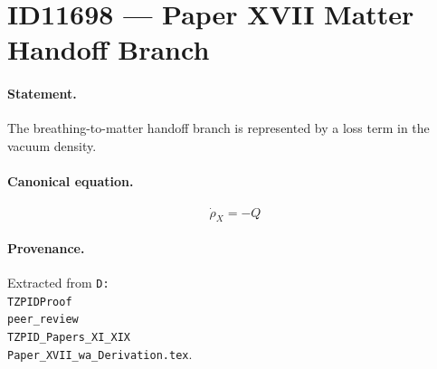 \section*{ID11698 --- Paper XVII Matter Handoff Branch}

\paragraph{Statement.}
The breathing-to-matter handoff branch is represented by a loss term in the vacuum density.

\paragraph{Canonical equation.}
\[
\dot{\rho}_X=-Q
\]

\paragraph{Provenance.}
Extracted from \texttt{D:\\TZPIDProof\\peer\_review\\TZPID\_Papers\_XI\_XIX\\Paper\_XVII\_wa\_Derivation.tex}.
